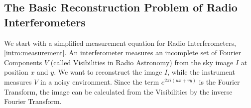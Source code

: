 


\subsection{The Basic Reconstruction Problem of Radio Interferometers}\label{intro:basic}
We start with a simplified measurement equation for Radio Interferometers, \eqref{intro:measurement}. An interferometer measures an incomplete set of Fourier Components $V$ (called Visibilities in Radio Astronomy) from the sky image $I$ at position $x$ and $y$. We want to reconstruct the image $I$, while the instrument measures $V$ in a noisy environment. Since the term $e^{2 \pi i (ux+vy)}$ is the Fourier Transform, the image can be calculated from the Visibilities by the inverse Fourier Transform.

